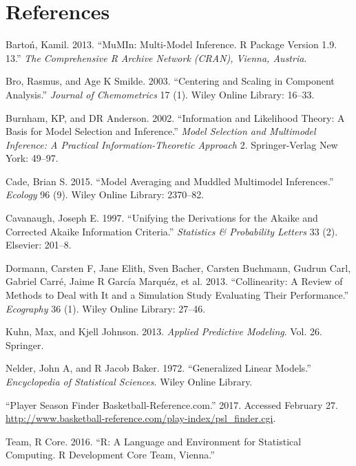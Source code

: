 \documentclass[]{elsarticle} %
\begin{document}
\section*{References}\label{references}

Barto{ń}, Kamil. 2013. ``MuMIn: Multi-Model Inference. R Package Version
1.9. 13.'' \emph{The Comprehensive R Archive Network (CRAN), Vienna,
Austria}.

Bro, Rasmus, and Age K Smilde. 2003. ``Centering and Scaling in
Component Analysis.'' \emph{Journal of Chemometrics} 17 (1). Wiley
Online Library: 16--33.

Burnham, KP, and DR Anderson. 2002. ``Information and Likelihood Theory:
A Basis for Model Selection and Inference.'' \emph{Model Selection and
Multimodel Inference: A Practical Information-Theoretic Approach} 2.
Springer-Verlag New York: 49--97.

Cade, Brian S. 2015. ``Model Averaging and Muddled Multimodel
Inferences.'' \emph{Ecology} 96 (9). Wiley Online Library: 2370--82.

Cavanaugh, Joseph E. 1997. ``Unifying the Derivations for the Akaike and
Corrected Akaike Information Criteria.'' \emph{Statistics \& Probability
Letters} 33 (2). Elsevier: 201--8.

Dormann, Carsten F, Jane Elith, Sven Bacher, Carsten Buchmann, Gudrun
Carl, Gabriel Carr{é}, Jaime R Garc{í}a Marqu{é}z, et al. 2013.
``Collinearity: A Review of Methods to Deal with It and a Simulation
Study Evaluating Their Performance.'' \emph{Ecography} 36 (1). Wiley
Online Library: 27--46.

Kuhn, Max, and Kjell Johnson. 2013. \emph{Applied Predictive Modeling}.
Vol. 26. Springer.

Nelder, John A, and R Jacob Baker. 1972. ``Generalized Linear Models.''
\emph{Encyclopedia of Statistical Sciences}. Wiley Online Library.

``Player Season Finder Basketball-Reference.com.'' 2017. Accessed
February 27.
\url{http://www.basketball-reference.com/play-index/psl_finder.cgi}.

Team, R Core. 2016. ``R: A Language and Environment for Statistical
Computing. R Development Core Team, Vienna.''
\end{document}
